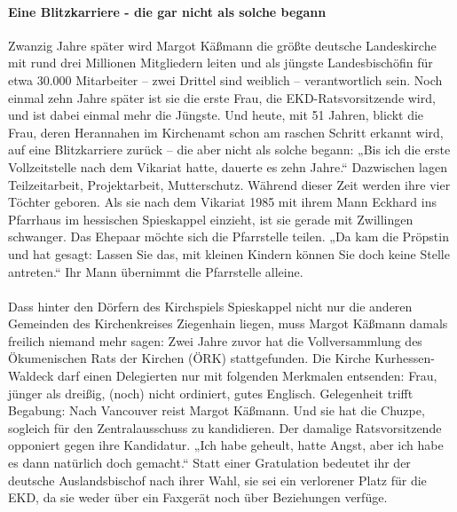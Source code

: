 \documentclass[a4paper,12pt,twoside]{scrbook}
\begin{document}
\paragraph{Eine Blitzkarriere - die gar nicht als solche begann}
Zwanzig Jahre später wird Margot Käßmann die größte deutsche Landeskirche mit rund drei Millionen Mitgliedern leiten und als jüngste Landesbischöfin für etwa 30.000 Mitarbeiter – zwei Drittel sind weiblich – verantwortlich sein. Noch einmal zehn Jahre später ist sie die erste Frau, die EKD-Ratsvorsitzende wird, und ist dabei einmal mehr die Jüngste. Und heute, mit 51 Jahren, blickt die Frau, deren Herannahen im Kirchenamt schon am raschen Schritt erkannt wird, auf eine Blitzkarriere zurück – die aber nicht als solche begann: „Bis ich die erste Vollzeitstelle nach dem Vikariat hatte, dauerte es zehn Jahre.“ Dazwischen lagen Teilzeitarbeit, Projektarbeit, Mutterschutz. Während dieser Zeit werden ihre vier Töchter geboren. Als sie nach dem Vikariat 1985 mit ihrem Mann Eckhard ins Pfarrhaus im hessischen Spieskappel einzieht, ist sie gerade mit Zwillingen schwanger. Das Ehepaar möchte sich die Pfarrstelle teilen. „Da kam die Pröpstin und hat gesagt: Lassen Sie das, mit kleinen Kindern können Sie doch keine Stelle antreten.“ Ihr Mann übernimmt die Pfarrstelle alleine.
\\\\
Dass hinter den Dörfern des Kirchspiels Spieskappel nicht nur die anderen Gemeinden des Kirchenkreises Ziegenhain liegen, muss Margot Käßmann damals freilich niemand mehr sagen: Zwei Jahre zuvor hat die Vollversammlung des Ökumenischen Rats der Kirchen (ÖRK) stattgefunden. Die Kirche Kurhessen-Waldeck darf einen Delegierten nur mit folgenden Merkmalen entsenden: Frau, jünger als dreißig, (noch) nicht ordiniert, gutes Englisch. Gelegenheit trifft Begabung: Nach Vancouver reist Margot Käßmann. Und sie hat die Chuzpe, sogleich für den Zentralausschuss zu kandidieren. Der damalige Ratsvorsitzende opponiert gegen ihre Kandidatur. „Ich habe geheult, hatte Angst, aber ich habe es dann natürlich doch gemacht.“ Statt einer Gratulation bedeutet ihr der deutsche Auslandsbischof nach ihrer Wahl, sie sei ein verlorener Platz für die EKD, da sie weder über ein Faxgerät noch über Beziehungen verfüge.
\end{document}

